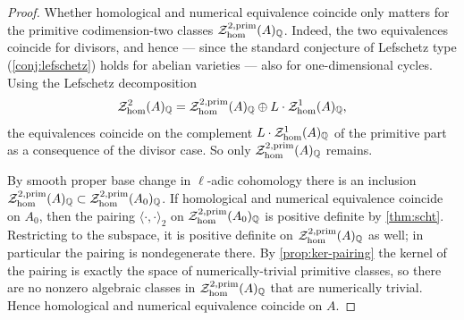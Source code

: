 \begin{proof}
  Whether homological and numerical equivalence coincide only matters for the
  primitive codimension-two classes \(\mathcal{Z}_{\hom}^{2,\mathrm{prim}}(A)_{\mathbb{Q}}\).
  Indeed, the two equivalences coincide for divisors, and hence — since the
  standard conjecture of Lefschetz type (\cref{conj:lefschetz}) holds for abelian
  varieties — also for one-dimensional cycles. Using the Lefschetz decomposition
  \[
    \mathcal{Z}_{\hom}^{2}(A)_{\mathbb{Q}}
      = \mathcal{Z}_{\hom}^{2,\mathrm{prim}}(A)_{\mathbb{Q}}
        \oplus L \cdot \mathcal{Z}_{\hom}^{1}(A)_{\mathbb{Q}},
  \]
  the equivalences coincide on the complement \(L \cdot
  \mathcal{Z}_{\hom}^{1}(A)_{\mathbb{Q}}\) of the primitive part as a consequence of the
  divisor case. So only \(\mathcal{Z}_{\hom}^{2,\mathrm{prim}}(A)_{\mathbb{Q}}\) remains.

  By smooth proper base change in \(\ell\)-adic cohomology there is an inclusion
  \(\mathcal{Z}_{\hom}^{2,\mathrm{prim}}(A)_{\mathbb{Q}} \subset
  \mathcal{Z}_{\hom}^{2,\mathrm{prim}}(A_0)_{\mathbb{Q}}\). If homological and numerical
  equivalence coincide on \(A_0\), then the pairing \(\langle \cdot, \cdot
  \rangle_{2}\) on \(\mathcal{Z}_{\hom}^{2,\mathrm{prim}}(A_0)_{\mathbb{Q}}\) is positive definite
  by \cref{thm:scht}. Restricting to the subspace, it is positive definite on
  \(\mathcal{Z}_{\hom}^{2,\mathrm{prim}}(A)_{\mathbb{Q}}\) as well; in particular the pairing is
  nondegenerate there. By \cref{prop:ker-pairing} the kernel of the pairing is
  exactly the space of numerically-trivial primitive classes, so there are no
  nonzero algebraic classes in \(\mathcal{Z}_{\hom}^{2,\mathrm{prim}}(A)_{\mathbb{Q}}\) that are
  numerically trivial. Hence homological and numerical equivalence coincide on
  \(A\).
\end{proof}

